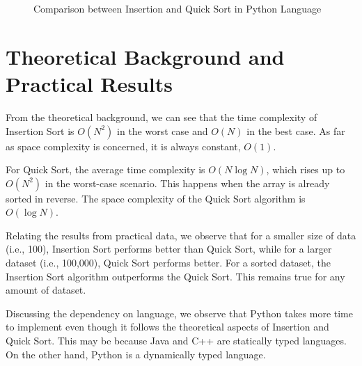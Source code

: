 \documentclass[twocolumn]{article}
\begin{document}
  \begin{figure}
    
    \caption{Comparison between Insertion and Quick Sort in Python Language}
    \end{figure}  
  
  
\clearpage
\section*{Theoretical Background and Practical Results}

From the theoretical background, we can see that the time complexity of Insertion Sort is $O(N^2)$ in the worst case and $O(N)$ in the best case. As far as space complexity is concerned, it is always constant, $O(1)$.

For Quick Sort, the average time complexity is $O(N \log N)$, which rises up to $O(N^2)$ in the worst-case scenario. This happens when the array is already sorted in reverse. The space complexity of the Quick Sort algorithm is $O(\log N)$.

Relating the results from practical data, we observe that for a smaller size of data (i.e., 100), Insertion Sort performs better than Quick Sort, while for a larger dataset (i.e., 100,000), Quick Sort performs better. For a sorted dataset, the Insertion Sort algorithm outperforms the Quick Sort. This remains true for any amount of dataset.

Discussing the dependency on language, we observe that Python takes more time to implement even though it follows the theoretical aspects of Insertion and Quick Sort. This may be because Java and C++ are statically typed languages. On the other hand, Python is a dynamically typed language.
\end{document}
